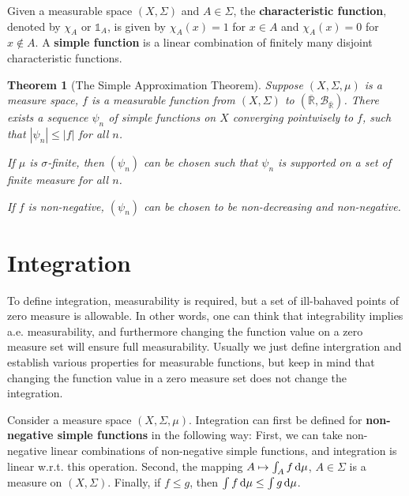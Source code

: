 \documentclass[openany]{book}
\newtheorem{theorem}{Theorem}[chapter]
\theoremstyle{definition}
\theoremstyle{remark}
\begin{document}
Given a measurable space $(X,\Sigma)$ and $A\in\Sigma$, the \textbf{characteristic function}, denoted by $\chi_A$ or $\mathds{1}_A$, is given by $\chi_A(x)=1$ for $x\in A$ and $\chi_A(x)=0$ for $x\not\in A$. A \textbf{simple function} is a linear combination of finitely many disjoint characteristic functions.
\begin{theorem}[The Simple Approximation Theorem]
    Suppose $(X,\Sigma,\mu)$ is a measure space, $f$ is a measurable function from $(X,\Sigma)$ to $(\overline{\mathbb{R}},\mathcal{B}_{\overline{\mathbb{R}}})$. There exists a sequence $\psi_n$ of simple functions on $X$ converging pointwisely to $f$, such that $|\psi_n|\le|f|$ for all $n$.

    If $\mu$ is $\sigma$-finite, then $(\psi_n)$ can be chosen such that $\psi_n$ is supported on a set of finite measure for all $n$.

    If $f$ is non-negative, $(\psi_n)$ can be chosen to be non-decreasing and non-negative.
\end{theorem}

\section{Integration}
To define integration, measurability is required, but a set of ill-bahaved points of zero measure is allowable. In other words, one can think that integrability implies a.e. measurability, and furthermore changing the function value on a zero measure set will ensure full measurability. Usually we just define intergration and establish various properties for measurable functions, but keep in mind that changing the function value in a zero measure set does not change the integration.

Consider a measure space $(X,\Sigma,\mu)$. Integration can first be defined for \textbf{non-negative simple functions} in the following way: First, we can take non-negative linear combinations of non-negative simple functions, and integration is linear w.r.t. this operation. Second, the mapping $A\mapsto\int_Af \dif\mu$, $A\in\Sigma$ is a measure on $(X,\Sigma)$. Finally, if $f\le g$, then $\int f \dif\mu\le\int g \dif\mu$.
\end{document}
